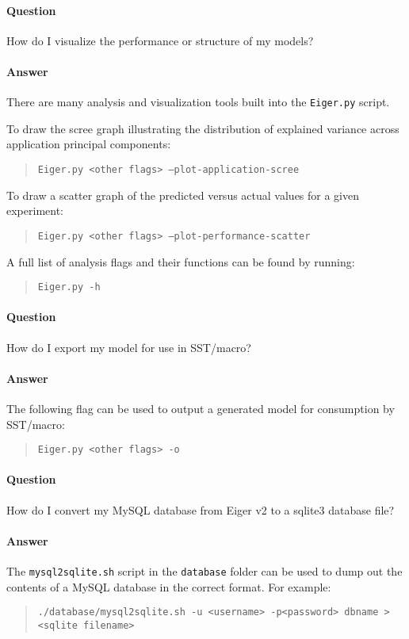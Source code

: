 \paragraph{Question}
How do I visualize the performance or structure of my models?
\paragraph{Answer}
There are many analysis and visualization tools built into the
\texttt{Eiger.py} script.

To draw the scree graph illustrating the distribution of explained variance
across application principal components:

	\begin{quote}
	\texttt{Eiger.py <other flags> --plot-application-scree}
	\end{quote}

To draw a scatter graph of the predicted versus actual values for a given
experiment:

	\begin{quote}
	\texttt{Eiger.py <other flags> --plot-performance-scatter}
	\end{quote}

A full list of analysis flags and their functions can be found by running:

	\begin{quote}
	\texttt{Eiger.py -h}
	\end{quote}

\paragraph{Question}
How do I export my model for use in SST/macro?
\paragraph{Answer}
The following flag can be used to output a generated model for
consumption by SST/macro:

	\begin{quote}
	\texttt{Eiger.py <other flags> -o}
	\end{quote}

\paragraph{Question}
How do I convert my MySQL database from Eiger v2 to a sqlite3 database file?
\paragraph{Answer}
The \texttt{mysql2sqlite.sh} script in the \texttt{database} folder can be used to dump out the contents of a MySQL database in the correct format. For example:

    \begin{quote}
    \texttt{./database/mysql2sqlite.sh -u <username> -p<password> dbname > <sqlite filename>}
    \end{quote}

